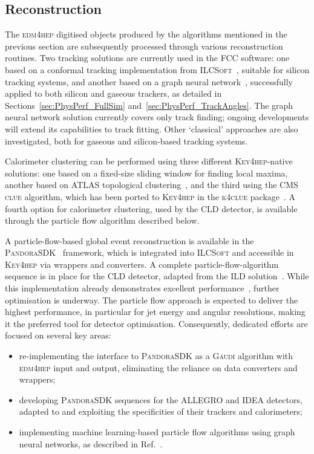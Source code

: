 \subsection{Reconstruction}
\label{sec:reco}

The \textsc{edm4hep} digitised objects produced by the algorithms mentioned in the previous section 
are subsequently processed through various reconstruction routines. 
Two tracking solutions are currently used in the FCC software: 
one based on a conformal tracking implementation from \textsc{ILCSoft}~\cite{conformaltracking}, 
suitable for silicon tracking systems, 
and another based on a graph neural network~\cite{MLTRACKING_NOTE}, 
successfully applied to both silicon and gaseous trackers, 
as detailed in Sections~\ref{sec:PhysPerf_FullSim} and~\ref{sec:PhysPerf_TrackAngles}. 
The graph neural network solution currently covers only track finding;
ongoing developments will extend its capabilities to track fitting. 
Other `classical' approaches are also investigated, both for gaseous and silicon-based tracking systems.

Calorimeter clustering can be performed using three different \textsc{Key4hep}-native solutions: 
one based on a fixed-size sliding window for finding local maxima, 
another based on ATLAS topological clustering~\cite{topoclustering}, 
and the third using the CMS \textsc{clue} algorithm, 
which has been ported to \textsc{Key4hep} in the \textsc{k4clue} package~\cite{k4clue}. 
A fourth option for calorimeter clustering, used by the CLD detector, 
is available through the particle flow algorithm described below.

A particle-flow-based global event reconstruction is available in the \textsc{PandoraSDK}~\cite{pandorasdk} framework, 
which is integrated into \textsc{ILCSoft} and accessible in \textsc{Key4hep} via wrappers and converters. 
A complete particle-flow-algorithm sequence is in place for the CLD detector, adapted from the ILD solution~\cite{pandorapfa}. 
While this implementation already demonstrates excellent performance~\cite{CLD}, further optimisation is underway. 
The particle flow approach is expected to deliver the highest performance, in particular for jet energy and angular resolutions, 
making it the preferred tool for detector optimisation. 
Consequently, dedicated efforts are focused on several key areas:
\begin{itemize}
\item re-implementing the interface to \textsc{PandoraSDK} as a \textsc{Gaudi} algorithm with \textsc{edm4hep} input and output, 
eliminating the reliance on data converters and wrappers;
\item developing \textsc{PandoraSDK} sequences for the ALLEGRO and IDEA detectors, 
adapted to and exploiting the specificities of their trackers and calorimeters;
\item implementing machine learning-based particle flow algorithms using graph neural networks, 
as described in Ref.~\cite{MLPF_NOTE}.
\end{itemize}

